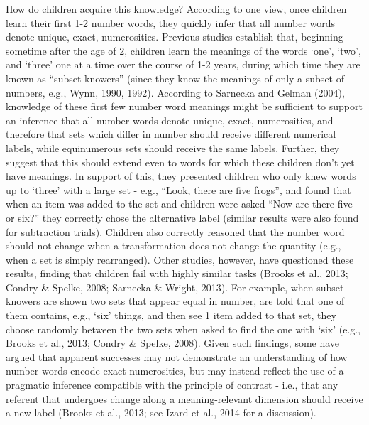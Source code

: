 \documentclass[
  man,floatsintext]{apa7}
\begin{document}
How do children acquire this knowledge? According to one view, once children learn their first 1-2 number words, they quickly infer that all number words denote unique, exact, numerosities. Previous studies establish that, beginning sometime after the age of 2, children learn the meanings of the words `one', `two', and `three' one at a time over the course of 1-2 years, during which time they are known as ``subset-knowers'' (since they know the meanings of only a subset of numbers, e.g., Wynn, 1990, 1992). According to Sarnecka and Gelman (2004), knowledge of these first few number word meanings might be sufficient to support an inference that all number words denote unique, exact, numerosities, and therefore that sets which differ in number should receive different numerical labels, while equinumerous sets should receive the same labels. Further, they suggest that this should extend even to words for which these children don't yet have meanings. In support of this, they presented children who only knew words up to `three' with a large set - e.g., ``Look, there are five frogs'', and found that when an item was added to the set and children were asked ``Now are there five or six?'' they correctly chose the alternative label (similar results were also found for subtraction trials). Children also correctly reasoned that the number word should not change when a transformation does not change the quantity (e.g., when a set is simply rearranged). Other studies, however, have questioned these results, finding that children fail with highly similar tasks (Brooks et al., 2013; Condry \& Spelke, 2008; Sarnecka \& Wright, 2013). For example, when subset-knowers are shown two sets that appear equal in number, are told that one of them contains, e.g., `six' things, and then see 1 item added to that set, they choose randomly between the two sets when asked to find the one with `six' (e.g., Brooks et al., 2013; Condry \& Spelke, 2008). Given such findings, some have argued that apparent successes may not demonstrate an understanding of how number words encode exact numerosities, but may instead reflect the use of a pragmatic inference compatible with the principle of contrast - i.e., that any referent that undergoes change along a meaning-relevant dimension should receive a new label (Brooks et al., 2013; see Izard et al., 2014 for a discussion).
\end{document}

